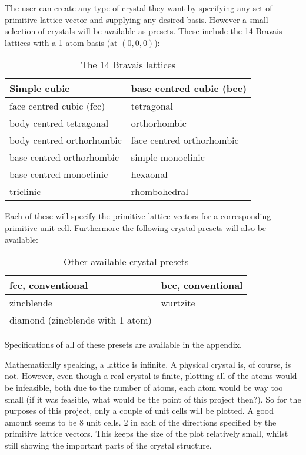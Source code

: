 \documentclass[a4paper,10pt]{article}
\numberwithin{equation}{section}
\begin{document}
	The user can create any type of crystal they want by specifying any set of primitive lattice vector and supplying any desired basis. However a small selection of crystals will be available as presets. These include the 14 Bravais lattices with a 1 atom basis (at $ (0,0,0) $):
	\begin{table}
		\centering
		\begin{tabular}{|l|l|}
			\hline
			Simple cubic & base centred cubic (bcc) \\
			\hline
			face centred cubic (fcc) & tetragonal \\
			\hline
			body centred tetragonal & orthorhombic \\
			\hline
			body centred orthorhombic & face centred orthorhombic \\
			\hline
			base centred orthorhombic & simple monoclinic \\
			\hline
			base centred monoclinic & hexaonal \\
			\hline
			triclinic & rhombohedral \\
			\hline
		\end{tabular}
		\caption{The 14 Bravais lattices}
		\label{tab:bravais}
	\end{table}
	
	Each of these will specify the primitive lattice vectors for a corresponding primitive unit cell. Furthermore the following crystal presets will also be available:
	\begin{table}
		\centering
		\begin{tabular}{|l|l|}
			\hline
			fcc, conventional & bcc, conventional \\
			\hline
			zincblende & wurtzite \\
			\hline
			diamond (zincblende with 1 atom) & \\
			\hline
		\end{tabular}
		\caption{Other available crystal presets}
		\label{tab:presets}
	\end{table}
	Specifications of all of these presets are available in the appendix.

	Mathematically speaking, a lattice is infinite. A physical crystal is, of course, is not. However, even though a real crystal is finite, plotting all of the atoms would be infeasible, both due to the number of atoms, each atom would be way too small (if it was feasible, what would be the point of this project then?). So for the purposes of this project, only a couple of unit cells will be plotted. A good amount seems to be 8 unit cells. 2 in each of the directions specified by the primitive lattice vectors. This keeps the size of the plot relatively small, whilst still showing the important parts of the crystal structure.
	
\end{document}
